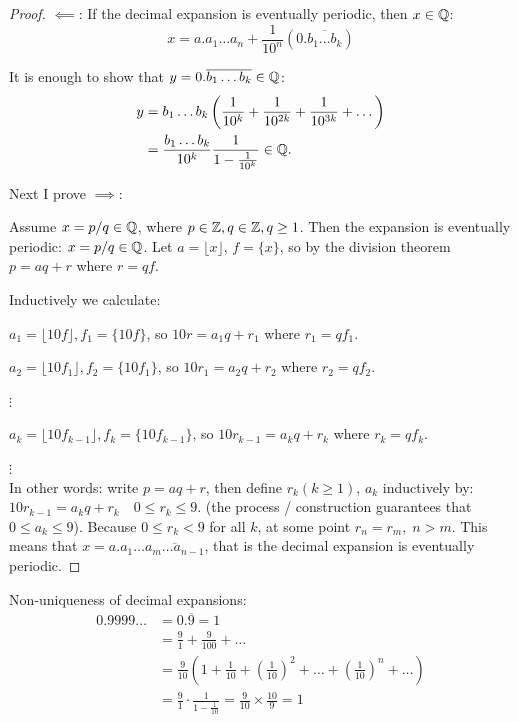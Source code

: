 \documentclass[10pt]{scrartcl}
\begin{document}
\begin{proof}
$\impliedby$: If the decimal expansion is eventually periodic, then $x\in\mathbb{Q}$:
\[x = a.a_1\dots a_n +\frac{1}{10^n}(0.\overline{b_1\dots b_k})\]

It is enough to show that $y = 0.\overline{b_1\dots b_k} \in\mathbb{Q}$:
\[
\begin{aligned}
  y &= b_1\dots b_k\left(\frac{1}{10^k} + \frac{1}{10^{2k}} + \frac{1}{10^{3k}} + \dots \right)\\
  &= \frac{b_1\dots b_k}{10^k} \frac{1}{1-\frac{1}{10^k}} \in \mathbb{Q}.
\end{aligned}
\]

Next I prove $\implies$:

 Assume $x = p/q \in\mathbb{Q}$, where $p \in\mathbb{Z}, q \in\mathbb{Z}, q \geq 1$. Then the expansion is eventually periodic: $x = p/q \in\mathbb{Q}$. Let $a = \lfloor x \rfloor$, $f = \{x\}$, so by the division theorem $p = aq + r$ where $r = qf$. 

Inductively we calculate: 

$a_1 = \lfloor 10f\rfloor, f_1 = \{10f\}$, so $10r = a_1q + r_1$ where $r_1 =qf_1$. 

$a_2 = \lfloor 10f_1\rfloor, f_2 = \{10f_1\}$, so $10r_1 = a_2q + r_2$ where $r_2 = qf_2$. 

\hspace*{5cm} $\vdots$

$a_k = \lfloor 10f_{k-1}\rfloor, f_k = \{10f_{k-1}\}$, so $10r_{k-1} = a_kq + r_k$ where $r_k = qf_k$. 

\hspace*{5cm} $\vdots$\\


In other words: write $p = aq + r$, then define $r_k (k \geq 1)$, $a_k$ inductively by: $10r_{k-1} = a_kq + r_k\quad 0 \leq r_k \leq 9$. 
(the process / construction guarantees that $0\leq a_k \leq 9$). Because $0 \leq r_k < 9$ for all $k$, at some point $r_n = r_m,\; n > m$. This means that $x = a.a_1 \dots \overline{a_m\dots a_{n-1}}$, that is the decimal expansion is eventually periodic. 
\end{proof}

Non-uniqueness of decimal expansions:  
\[
\begin{aligned}
  0.9999 \dots &= 0.\overline{9} = 1\\
  &= \frac{9}{1} + \frac{9}{100} + \dots \\
  &= \frac{9}{10}\left( 1 + \frac{1}{10} + \left(\frac{1}{10}\right)^2 + \dots + \left(\frac{1}{10}\right)^n + \dots \right)\\
  &= \frac{9}{1} \cdot \frac{1}{1 -\frac{1}{10}} = \frac{9}{10} \times \frac{10}{9} = 1
\end{aligned}
\]\vspace*{5pt}
\end{document}
